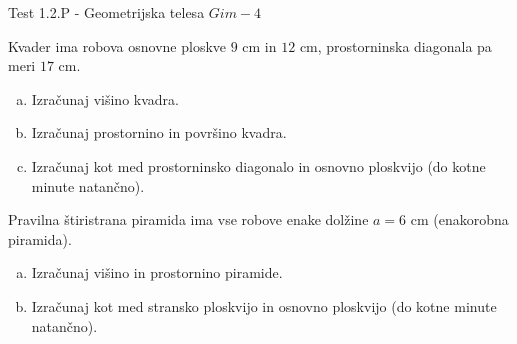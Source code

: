 \documentclass[a4paper,12pt]{letter}
\renewcommand{\headrulewidth}{3pt}
\renewcommand{\headrulewidth}{0.3pt}
\newcounter{tocke}
\begin{document}
\pagestyle{fancy}
\renewcommand\headrulewidth{0pt}
\lhead{}\chead{}\rhead{}
\rfoot{\vspace*{-2\baselineskip}}
\renewcommand{\vec}{\overrightarrow}
\def\programletnik{Gim - 4}
\def\naslov{Test 1.2.P - }
\def\sklop{Geometrijska telesa}
\def\tockeA{3+4+4}
\def\tockeB{4+4}
\def\tockeC{4+4}
\def\tockeD{4+4}
\begin{minipage}{20cm}
\begin{bclogo}[couleur=brown!30,
  arrondi=0,ombre=true, couleurOmbre=gray!50,
logo =\bcplume,
  noborder=true]
{\textrm{{\Large{\naslov \sklop} \Huge{}
\large{} \hfill $\programletnik$}}}
\end{bclogo}
\end{minipage}
\begin{minipage}{20cm}
\begin{bclogo}[couleur=brown!30,
  arrondi=0,ombre=true, couleurOmbre=gray!50,
logo =\bcplume,
  noborder=true]
{\textrm{{}}}
\end{bclogo}
\end{minipage}

\begin{naloga}[\hfill $\tockeA$] \addtocounter{tocke}{\numexpr\tockeA\relax}
Kvader ima robova osnovne ploskve $9$ cm in $12$ cm, prostorninska diagonala pa meri $17$ cm.
\begin{enumerate}[a)]
\item Izra\v{c}unaj vi\v{s}ino kvadra.
\item Izra\v{c}unaj prostornino in povr\v{s}ino kvadra.
\item Izra\v{c}unaj kot med prostorninsko diagonalo in osnovno ploskvijo (do kotne minute natan\v{c}no).
\end{enumerate}
\end{naloga}\newpage

\begin{naloga}[\hfill $\tockeB$] \addtocounter{tocke}{\numexpr\tockeB\relax}
Pravilna \v{s}tiristrana piramida ima vse robove enake dol\v{z}ine $a=6$ cm (enakorobna piramida).
\begin{enumerate}[a)]
\item Izra\v{c}unaj vi\v{s}ino in prostornino piramide.
\item Izra\v{c}unaj kot med stransko ploskvijo in osnovno ploskvijo (do kotne minute natan\v{c}no).
\end{enumerate}
\end{naloga}\newpage
\end{document}
